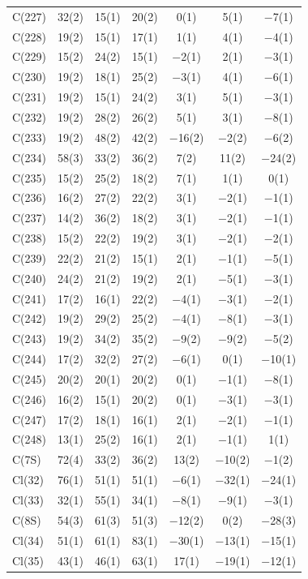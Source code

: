 \begin{center}
{\begin{supertabular}{lcccccc}
C(227)&32(2) &15(1)&20(2) &0(1)&5(1) &$-$7(1)\\
C(228)&19(2) &15(1)&17(1) &1(1)&4(1) &$-$4(1)\\
C(229)&15(2) &24(2)&15(1) &$-$2(1)&2(1) &$-$3(1)\\
C(230)&19(2) &18(1)&25(2) &$-$3(1)&4(1) &$-$6(1)\\
C(231)&19(2) &15(1)&24(2) &3(1)&5(1) &$-$3(1)\\
C(232)&19(2) &28(2)&26(2) &5(1)&3(1) &$-$8(1)\\
C(233)&19(2) &48(2)&42(2) &$-$16(2)&$-$2(2) &$-$6(2)\\
C(234)&58(3) &33(2)&36(2) &7(2)&11(2) &$-$24(2)\\
C(235)&15(2) &25(2)&18(2) &7(1)&1(1) &0(1)\\
C(236)&16(2) &27(2)&22(2) &3(1)&$-$2(1) &$-$1(1)\\
C(237)&14(2) &36(2)&18(2) &3(1)&$-$2(1) &$-$1(1)\\
C(238)&15(2) &22(2)&19(2) &3(1)&$-$2(1) &$-$2(1)\\
C(239)&22(2) &21(2)&15(1) &2(1)&$-$1(1) &$-$5(1)\\
C(240)&24(2) &21(2)&19(2) &2(1)&$-$5(1) &$-$3(1)\\
C(241)&17(2) &16(1)&22(2) &$-$4(1)&$-$3(1) &$-$2(1)\\
C(242)&19(2) &29(2)&25(2) &$-$4(1)&$-$8(1) &$-$3(1)\\
C(243)&19(2) &34(2)&35(2) &$-$9(2)&$-$9(2) &$-$5(2)\\
C(244)&17(2) &32(2)&27(2) &$-$6(1)&0(1) &$-$10(1)\\
C(245)&20(2) &20(1)&20(2) &0(1)&$-$1(1) &$-$8(1)\\
C(246)&16(2) &15(1)&20(2) &0(1)&$-$3(1) &$-$3(1)\\
C(247)&17(2) &18(1)&16(1) &2(1)&$-$2(1) &$-$1(1)\\
C(248)&13(1) &25(2)&16(1) &2(1)&$-$1(1) &1(1)\\
C(7S)&72(4) &33(2)&36(2) &13(2)&$-$10(2) &$-$1(2)\\
Cl(32)&76(1) &51(1)&51(1) &$-$6(1)&$-$32(1) &$-$24(1)\\
Cl(33)&32(1) &55(1)&34(1) &$-$8(1)&$-$9(1) &$-$3(1)\\
C(8S)&54(3) &61(3)&51(3) &$-$12(2)&0(2) &$-$28(3)\\
Cl(34)&51(1) &61(1)&83(1) &$-$30(1)&$-$13(1) &$-$15(1)\\
Cl(35)&43(1) &46(1)&63(1) &17(1)&$-$19(1) &$-$12(1)\\
\end{supertabular}
}
\end{center}

